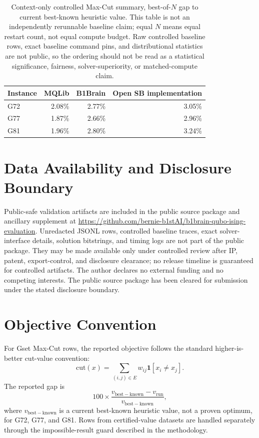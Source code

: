 \documentclass[11pt]{article}
\begin{document}
\begin{table}[H]
\centering
\caption{Context-only controlled Max-Cut summary, best-of-$N$ gap to current best-known heuristic value. This table is not an independently rerunnable baseline claim; equal $N$ means equal restart count, not equal compute budget. Raw controlled baseline rows, exact baseline command pins, and distributional statistics are not public, so the ordering should not be read as a statistical significance, fairness, solver-superiority, or matched-compute claim.}
\label{tab:controlled}
\small
\begin{tabular}{lrrr}
\toprule
Instance & MQLib & B1Brain & Open SB implementation \\
\midrule
G72 & 2.08\% & 2.77\% & 3.05\% \\
G77 & 1.87\% & 2.66\% & 2.96\% \\
G81 & 1.96\% & 2.80\% & 3.24\% \\
\bottomrule
\end{tabular}
\end{table}

\clearpage

\section{Data Availability and Disclosure Boundary}
Public-safe validation artifacts are included in the public source package and ancillary supplement at \url{https://github.com/bernie-b1stAI/b1brain-qubo-ising-evaluation}. Unredacted JSONL rows, controlled baseline traces, exact solver-interface details, solution bitstrings, and timing logs are not part of the public package. They may be made available only under controlled review after IP, patent, export-control, and disclosure clearance; no release timeline is guaranteed for controlled artifacts. The author declares no external funding and no competing interests. The public source package has been cleared for submission under the stated disclosure boundary.

\section{Objective Convention}
\label{sec:objectiveconvention}
For Gset Max-Cut rows, the reported objective follows the standard higher-is-better cut-value convention:
\[
  \mathrm{cut}(x)=\sum_{(i,j)\in E} w_{ij}\mathbf{1}[x_i \ne x_j].
\]
The reported gap is
\[
  100 \times \frac{v_{\mathrm{best-known}} - v_{\mathrm{run}}}{v_{\mathrm{best-known}}},
\]
where $v_{\mathrm{best-known}}$ is a current best-known heuristic value, not a proven optimum, for G72, G77, and G81. Rows from certified-value datasets are handled separately through the impossible-result guard described in the methodology.
\end{document}
